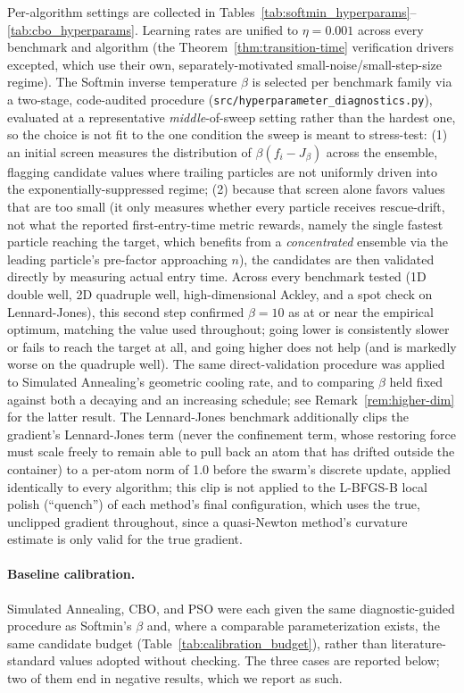 \documentclass{opt2026} %
\begin{document}
Per-algorithm settings are collected in Tables~\ref{tab:softmin_hyperparams}--\ref{tab:cbo_hyperparams}. Learning rates are unified to $\eta=0.001$ across every benchmark and algorithm (the Theorem~\ref{thm:transition-time} verification drivers excepted, which use their own, separately-motivated small-noise/small-step-size regime). The Softmin inverse temperature $\beta$ is selected per benchmark family via a two-stage, code-audited procedure (\texttt{src/hyperparameter\_diagnostics.py}), evaluated at a representative \emph{middle}-of-sweep setting rather than the hardest one, so the choice is not fit to the one condition the sweep is meant to stress-test: (1) an initial screen measures the distribution of $\beta(f_i-J_\beta)$ across the ensemble, flagging candidate values where trailing particles are not uniformly driven into the exponentially-suppressed regime; (2) because that screen alone favors values that are too small (it only measures whether every particle receives rescue-drift, not what the reported first-entry-time metric rewards, namely the single fastest particle reaching the target, which benefits from a \emph{concentrated} ensemble via the leading particle's pre-factor approaching $n$), the candidates are then validated directly by measuring actual entry time. Across every benchmark tested (1D double well, 2D quadruple well, high-dimensional Ackley, and a spot check on Lennard-Jones), this second step confirmed $\beta=10$ as at or near the empirical optimum, matching the value used throughout; going lower is consistently slower or fails to reach the target at all, and going higher does not help (and is markedly worse on the quadruple well). The same direct-validation procedure was applied to Simulated Annealing's geometric cooling rate, and to comparing $\beta$ held fixed against both a decaying and an increasing schedule; see Remark~\ref{rem:higher-dim} for the latter result. The Lennard-Jones benchmark additionally clips the gradient's Lennard-Jones term (never the confinement term, whose restoring force must scale freely to remain able to pull back an atom that has drifted outside the container) to a per-atom norm of 1.0 before the swarm's discrete update, applied identically to every algorithm; this clip is not applied to the L-BFGS-B local polish (``quench'') of each method's final configuration, which uses the true, unclipped gradient throughout, since a quasi-Newton method's curvature estimate is only valid for the true gradient.

\paragraph{Baseline calibration.} Simulated Annealing, CBO, and PSO were each given the same diagnostic-guided procedure as Softmin's $\beta$ and, where a comparable parameterization exists, the same candidate budget (Table~\ref{tab:calibration_budget}), rather than literature-standard values adopted without checking. The three cases are reported below; two of them end in negative results, which we report as such.
\end{document}
